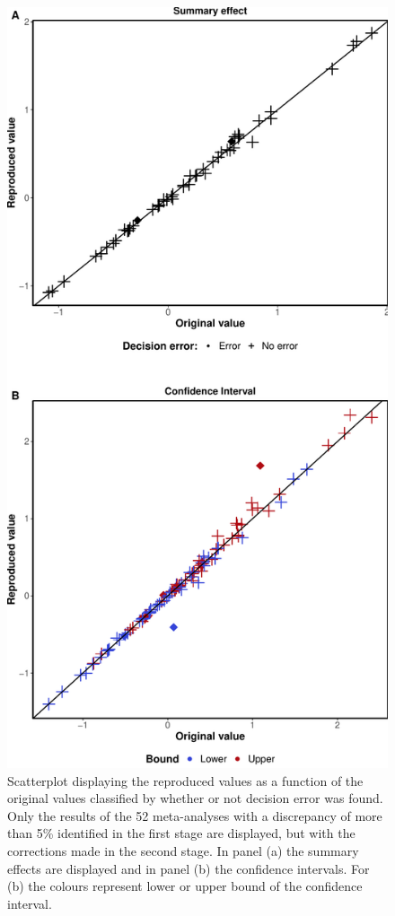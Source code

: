 \documentclass[
  ,jou, a4paper,floatsintext]{apa6}
\begin{document}
\begin{figure}
\centering
\includegraphics{manuscript_files/figure-latex/unnamed-chunk-4-1.pdf}
\caption{\label{fig:unnamed-chunk-4}Scatterplot displaying the reproduced values as a function of the original values classified by whether or not decision error was found. Only the results of the 52 meta-analyses with a discrepancy of more than 5\% identified in the first stage are displayed, but with the corrections made in the second stage. In panel (a) the summary effects are displayed and in panel (b) the confidence intervals. For (b) the colours represent lower or upper bound of the confidence interval.}
\end{figure}
\end{document}
